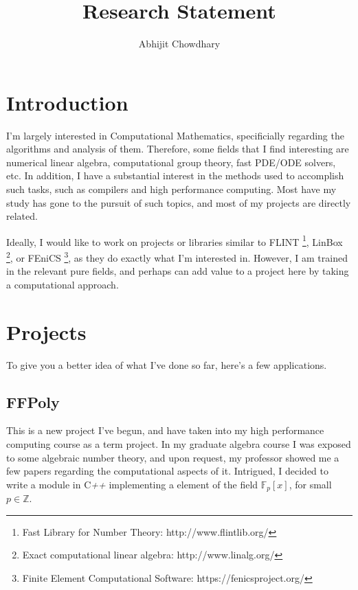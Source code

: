 \documentclass[12pt]{article}
\begin{document}
 

 
\title{Research Statement}%
\author{Abhijit Chowdhary\\ %
} %

\maketitle

\section{Introduction}

I'm largely interested in Computational Mathematics, specificially regarding the
algorithms and analysis of them. Therefore, some fields that I find interesting
are numerical linear algebra, computational group theory, fast PDE/ODE solvers,
etc. In addition, I have a substantial interest in the methods used to
accomplish such tasks, such as compilers and high performance computing. Most
have my study has gone to the pursuit of such topics, and most of my projects
are directly related.

Ideally, I would like to work on projects or libraries similar to FLINT
\footnote{Fast Library for Number Theory: http://www.flintlib.org/}, LinBox
\footnote{Exact computational linear algebra: http://www.linalg.org/}, or FEniCS
\footnote{Finite Element Computational Software: https://fenicsproject.org/}, as
they do exactly what I'm interested in. However, I am trained in the relevant
pure fields, and perhaps can add value to a project here by taking a
computational approach. 


\section{Projects}

To give you a better idea of what I've done so far, here's a few applications.

\subsection{FFPoly}

This is a new project I've begun, and have taken into my high
performance computing course as a term project.  In my graduate algebra course I
was exposed to some algebraic number theory, and upon request, my professor
showed me a few papers regarding the computational aspects of it. Intrigued, I
decided to write a module in C\textit{++} implementing a element of the field
$\mathbb{F}_p[x]$, for small $p \in \mathbb{Z}$. 
\end{document}
